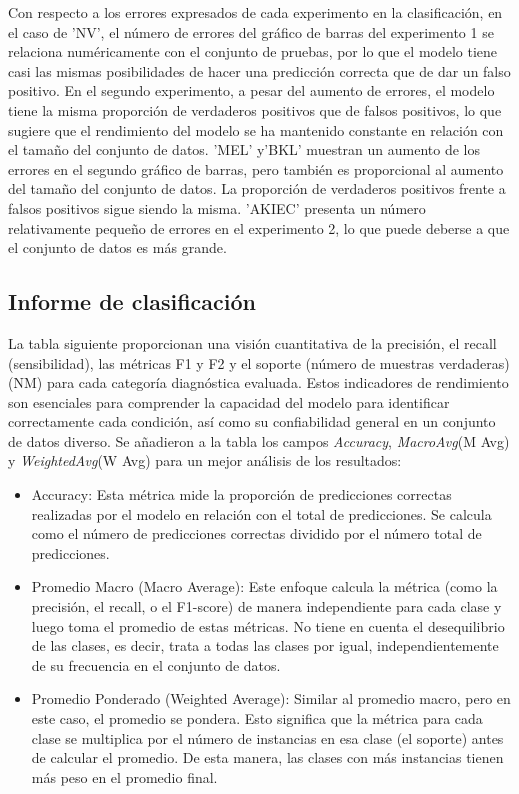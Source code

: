 Con respecto a los errores expresados de cada experimento en la clasificación, en el caso de 'NV', el número de errores del gráfico de barras del experimento 1 se relaciona numéricamente con el conjunto de pruebas, por lo que el modelo tiene casi las mismas posibilidades de hacer una predicción correcta que de dar un falso positivo. En el segundo experimento, a pesar del aumento de errores, el modelo tiene la misma proporción de verdaderos positivos que de falsos positivos, lo que sugiere que el rendimiento del modelo se ha mantenido constante en relación con el tamaño del conjunto de datos. 'MEL' y'BKL' muestran un aumento de los errores en el segundo gráfico de barras, pero también es proporcional al aumento del tamaño del conjunto de datos. La proporción de verdaderos positivos frente a falsos positivos sigue siendo la misma. 'AKIEC' presenta un número relativamente pequeño de errores en el experimento 2, lo que puede deberse a que el conjunto de datos es más grande.

\subsection*{Informe de clasificación}

La tabla siguiente proporcionan una visión cuantitativa de la precisión, el recall (sensibilidad), las métricas F1 y F2 y el soporte (número de muestras verdaderas) (NM) para cada categoría diagnóstica evaluada. Estos indicadores de rendimiento son esenciales para comprender la capacidad del modelo para identificar correctamente cada condición, así como su confiabilidad general en un conjunto de datos diverso. Se añadieron a la tabla los campos \textit{Accuracy}, \textit{MacroAvg}(M Avg) y \textit{WeightedAvg}(W Avg) para un mejor análisis de los resultados:
\begin{itemize}
    \item Accuracy: Esta métrica mide la proporción de predicciones correctas realizadas por el modelo en relación con el total de predicciones. Se calcula como el número de predicciones correctas dividido por el número total de predicciones.
    \item Promedio Macro (Macro Average): Este enfoque calcula la métrica (como la precisión, el recall, o el F1-score) de manera independiente para cada clase y luego toma el promedio de estas métricas. No tiene en cuenta el desequilibrio de las clases, es decir, trata a todas las clases por igual, independientemente de su frecuencia en el conjunto de datos.
    \item Promedio Ponderado (Weighted Average): Similar al promedio macro, pero en este caso, el promedio se pondera. Esto significa que la métrica para cada clase se multiplica por el número de instancias en esa clase (el soporte) antes de calcular el promedio. De esta manera, las clases con más instancias tienen más peso en el promedio final.
\end{itemize}

